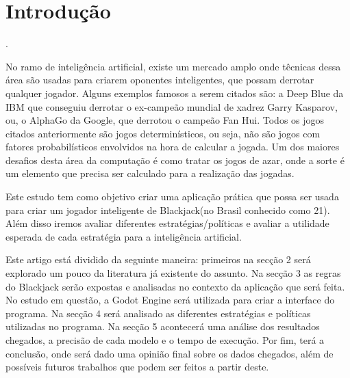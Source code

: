 \section{Introdução}


    \cite{Sibgrapi2021}.

    No ramo de inteligência artificial, existe um mercado amplo onde 
    têcnicas dessa área são usadas para criarem oponentes inteligentes, 
    que possam derrotar qualquer jogador. Alguns exemplos famosos a serem 
    citados são: a Deep Blue da IBM que conseguiu derrotar o ex-campeão 
    mundial de xadrez Garry Kasparov, ou, o AlphaGo da Google, que derrotou 
    o campeão Fan Hui. Todos os jogos citados anteriormente são jogos determinísticos, 
    ou seja, não são jogos com fatores probabilísticos envolvidos na hora de calcular 
    a jogada. Um dos maiores desafios desta área da computação
    é como tratar os jogos de azar, onde a sorte é um elemento que 
    precisa ser calculado para a realização das jogadas.

    Este estudo tem como objetivo criar uma aplicação prática que 
    possa ser usada para criar um jogador inteligente de Blackjack(no 
    Brasil conhecido como 21). Além disso iremos avaliar diferentes 
    estratégias/políticas e avaliar a utilidade esperada de cada estratégia 
    para a inteligência artificial.

    Este artigo está dividido da seguinte maneira: primeiros na secção 2 
    será explorado um pouco da literatura já existente do assunto. Na secção 
    3 as regras do Blackjack serão expostas e analisadas no contexto da aplicação 
    que será feita. No estudo em questão, a Godot Engine será utilizada para 
    criar a interface do programa. Na secção 4 será analisado as diferentes 
    estratégias e políticas utilizadas no programa. Na secção 5 acontecerá uma análise 
    dos resultados chegados, a precisão de cada modelo e o tempo de execução. Por fim, 
    terá a conclusão, onde será dado uma opinião final sobre os dados chegados, além de possíveis 
    futuros trabalhos que podem ser feitos a partir deste.